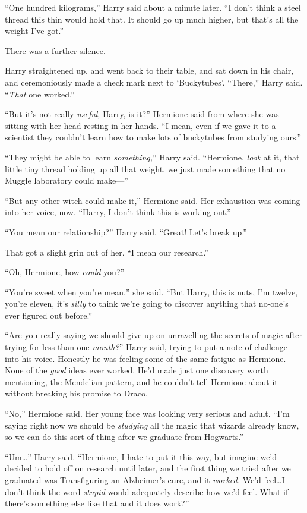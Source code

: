 “One hundred kilograms,” Harry said about a minute later. “I don’t think a steel thread this thin would hold that. It should go up much higher, but that’s all the weight I’ve got.”

There was a further silence.

Harry straightened up, and went back to their table, and sat down in his chair, and ceremoniously made a check mark next to ‘Buckytubes’. “There,” Harry said. “\emph{That} one worked.”

“But it’s not really \emph{useful}, Harry, is it?” Hermione said from where she was sitting with her head resting in her hands. “I mean, even if we gave it to a scientist they couldn’t learn how to make lots of buckytubes from studying ours.”

“They might be able to learn \emph{something,}” Harry said. “Hermione, \emph{look} at it, that little tiny thread holding up all that weight, we just made something that no Muggle laboratory could make—”

“But any other witch could make it,” Hermione said. Her exhaustion was coming into her voice, now. “Harry, I don’t think this is working out.”

“You mean our relationship?” Harry said. “Great! Let’s break up.”

That got a slight grin out of her. “I mean our research.”

“Oh, Hermione, how \emph{could} you?”

“You’re sweet when you’re mean,” she said. “But Harry, this is nuts, I’m twelve, you’re eleven, it’s \emph{silly} to think we’re going to discover anything that no-one’s ever figured out before.”

“Are you really saying we should give up on unravelling the secrets of magic after trying for less than one \emph{month?}” Harry said, trying to put a note of challenge into his voice. Honestly he was feeling some of the same fatigue as Hermione. None of the \emph{good} ideas ever worked. He’d made just one discovery worth mentioning, the Mendelian pattern, and he couldn’t tell Hermione about it without breaking his promise to Draco.

“No,” Hermione said. Her young face was looking very serious and adult. “I’m saying right now we should be \emph{studying} all the magic that wizards already know, so we can do this sort of thing after we graduate from Hogwarts.”

“Um…” Harry said. “Hermione, I hate to put it this way, but imagine we’d decided to hold off on research until later, and the first thing we tried after we graduated was Transfiguring an Alzheimer’s cure, and it \emph{worked.} We’d feel…I don’t think the word \emph{stupid} would adequately describe how we’d feel. What if there’s something else like that and it does work?”


